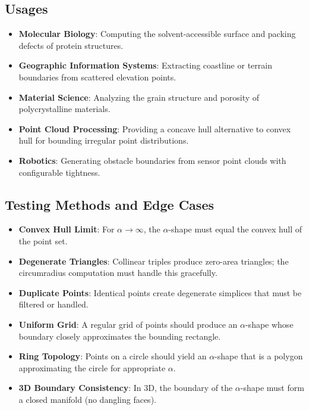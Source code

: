 \subsection{Usages}
\begin{itemize}
\item \textbf{Molecular Biology}: Computing the solvent-accessible surface and packing defects of protein structures.
\item \textbf{Geographic Information Systems}: Extracting coastline or terrain boundaries from scattered elevation points.
\item \textbf{Material Science}: Analyzing the grain structure and porosity of polycrystalline materials.
\item \textbf{Point Cloud Processing}: Providing a concave hull alternative to convex hull for bounding irregular point distributions.
\item \textbf{Robotics}: Generating obstacle boundaries from sensor point clouds with configurable tightness.
\end{itemize}

\subsection{Testing Methods and Edge Cases}
\begin{itemize}
\item \textbf{Convex Hull Limit}: For $\alpha \to \infty$, the $\alpha$-shape must equal the convex hull of the point set.
\item \textbf{Degenerate Triangles}: Collinear triples produce zero-area triangles; the circumradius computation must handle this gracefully.
\item \textbf{Duplicate Points}: Identical points create degenerate simplices that must be filtered or handled.
\item \textbf{Uniform Grid}: A regular grid of points should produce an $\alpha$-shape whose boundary closely approximates the bounding rectangle.
\item \textbf{Ring Topology}: Points on a circle should yield an $\alpha$-shape that is a polygon approximating the circle for appropriate $\alpha$.
\item \textbf{3D Boundary Consistency}: In 3D, the boundary of the $\alpha$-shape must form a closed manifold (no dangling faces).
\end{itemize}

